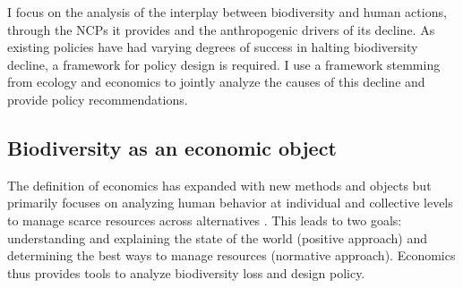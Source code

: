 I focus on the analysis of the interplay between biodiversity and human actions, through the NCPs it provides and the anthropogenic drivers of its decline. As existing policies have had varying degrees of success in halting biodiversity decline, a framework for policy design is required. I use a framework stemming from ecology and economics to jointly analyze the causes of this decline and provide policy recommendations. 

{}
\subsection*{Biodiversity as an economic object}

The definition of economics has expanded with new methods and objects but primarily focuses on analyzing human behavior at individual and collective levels to manage scarce resources across alternatives \citep{mankiw_principles_2011, bade_foundations_2002, backhouse_retrospectives_2009}. This leads to two goals: understanding and explaining the state of the world (positive approach) and determining the best ways to manage resources (normative approach). Economics thus provides tools to analyze biodiversity loss and design policy.


